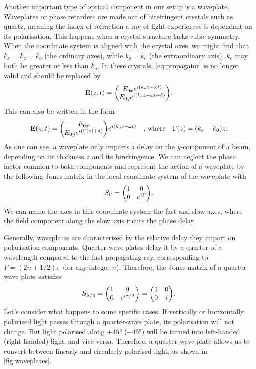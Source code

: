 Another important type of optical component in our setup is a waveplate. Waveplates or phase retarders are made out of birefringent crystals such as quartz, meaning the index of refraction a ray of light experiences is dependent on its polarisation. This happens when a crystal structure lacks cubic symmetry. When the coordinate system is aligned with the crystal axes, we might find that $ k_x = k_z = k_o $ (the ordinary axes), while $ k_y = k_e $ (the extraordinary axis). $ k_e $ may both be greater or less than $ k_o $. In these crystals, \autoref{eq:propagator} is no longer valid and should be replaced by
\begin{equation}
	\vb{E}(z, t) = \mqty(\Eox e^{i(k_o z-\omega t)} \\ \Eoy e^{i(k_e z-\omega t + \delta)} ).
\end{equation}
This can also be written in the form
\begin{equation}
	\vb{E}(z, t) = \mqty(\Eox  \\ \Eoy e^{i(\Gamma(z) + \delta)} ) e^{i(k_o z-\omega t)}
	\qq{, where}
	\Gamma(z) = (k_e-k_0) z.
\end{equation}
As one can see, a waveplate only imparts a delay on the $ y $-component of a beam, depending on its thickness $ z $ and its birefringence. We can neglect the phase factor common to both components and represent the action of a waveplate by the following Jones matrix in the local coordinate system of the waveplate with
\begin{equation}
	S_\Gamma = \mqty(1 & 0 \\ 0 & e^{i\Gamma}).
\end{equation}
We can name the axes in this coordinate system the fast and slow axes, where the field component along the slow axis incurs the phase delay.

Generally, waveplates are characterised by the relative delay they impart on polarisation components. Quarter-wave plates delay it by a quarter of a wavelength compared to the fast propagating ray, corresponding to $ \Gamma = (2n + 1/2)\pi $ (for any integer $ n $). Therefore, the Jones matrix of a quarter-wave plate satisfies 
\begin{equation}
	S_\qwp = \mqty(1 & 0 \\ 0 & e^{i\pi/2}) = \mqty(1 & 0 \\ 0 & i).
\end{equation}
Let's consider what happens to some specific cases. If vertically or horizontally polarised light passes through a quarter-wave plate, its polarisation will not change. But light polarised along $ +\ang{45} $ ($ -\ang{45} $) will be turned into left-handed (right-handed) light, and vice versa. Therefore, a quarter-wave plate allows us to convert between linearly and circularly polarised light, as shown in \autoref{fig:waveplates}.

